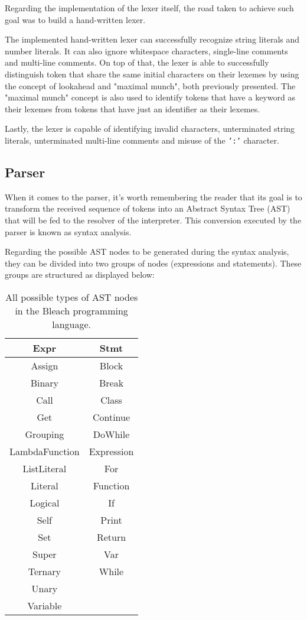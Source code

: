Regarding the implementation of the lexer itself, the road taken to achieve such goal was to build a hand-written lexer.

The implemented hand-written lexer can successfully recognize string literals and number literals. It can also ignore whitespace characters, single-line comments and multi-line comments. On top of that, the lexer is able to successfully distinguish token that share the same initial characters on their lexemes by using the concept of lookahead and "maximal munch", both previously presented. The "maximal munch" concept is also used to identify tokens that have a keyword as their lexemes from tokens that have just an identifier as their lexemes. 

Lastly, the lexer is capable of identifying invalid characters, unterminated string literals, unterminated multi-line comments and misuse of the \texttt{':'} character.

\subsection{Parser}
When it comes to the parser, it's worth remembering the reader that its goal is to transform the received sequence of tokens into an Abstract Syntax Tree (AST) that will be fed to the resolver of the interpreter. This conversion executed by the parser is known as syntax analysis.

Regarding the possible AST nodes to be generated during the syntax analysis, they can be divided into two groups of nodes (expressions and statements). These groups are structured as displayed below:

\begin{table}[h!]
\centering
    \begin{tabular}{|c|c|}
    \hline
    \textbf{Expr} & \textbf{Stmt} \\ \hline
    Assign & Block \\ \hline
    Binary & Break \\ \hline
    Call & Class \\ \hline
    Get & Continue \\ \hline
    Grouping & DoWhile \\ \hline
    LambdaFunction & Expression \\ \hline
    ListLiteral & For \\ \hline
    Literal & Function \\ \hline
    Logical & If \\ \hline
    Self & Print \\ \hline
    Set & Return \\ \hline
    Super & Var \\ \hline  
    Ternary & While \\ \hline
    Unary &  \\ \hline
    Variable &  \\ \hline
    \end{tabular}
    \label{tab:AST_nodes}  %
    \caption{All possible types of AST nodes in the Bleach programming language. \newline}
\end{table}

